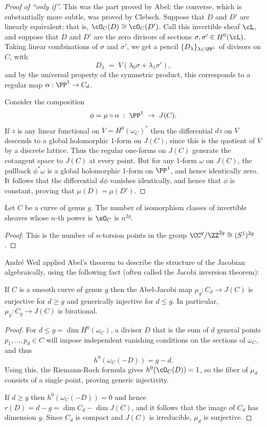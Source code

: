 \begin{proof}[Proof of ``only if'']
This was the part proved by Abel; the converse, which is substantially more subtle, was proved by Clebsch. Suppose that $D$ and $D'$ are linearly equivalent; that is, $\cO_C(D) \cong \cO_C(D')$. Call this invertible sheaf $\cL$, and suppose that $D$ and $D'$ are the zero divisors of sections $\sigma, \sigma' \in H^0(\cL)$.
Taking linear combinations of $\sigma$ and $\sigma'$, we get a pencil $\{D_\lambda\}_{\lambda \in \PP^1}$ of divisors on $C$, with
$$
D_\lambda \; = \; V(\lambda_0\sigma + \lambda_1\sigma'),
$$
and by the universal property of the symmetric product, this corresponds to a regular map $\alpha : \PP^1 \to C_d$. 

Consider the composition
$$
\phi = \mu \circ \alpha \; : \; \PP^1 \; \to \; J(C).
$$
 If $z$ is any linear functional on $V = H^0(\omega_C)^*$ then the differential $dz$  on $V$ descends to a global holomorphic 1-form on
 $J(C)$, since this is the quotient of $V$ by a discrete lattice. Thus the regular one-forms on $J(C)$ generate the cotangent space to $J(C)$ at every point. But for any 1-form $\omega$ on $J(C)$, the pullback $\phi^*\omega$ is a global holomorphic 1-form on $\PP^1$, and hence identically zero. It follows that the differential $d\phi$ vanishes identically, and hence that $\phi$ is constant, proving that $\mu(D) = \mu(D')$.
\end{proof}

\begin{corollary}\label{torsion points}
Let $C$ be a curve of genus $g$. The number of isomorphism classes of invertible sheaves whose $n$-th power is $\sO_C$ is $n^{2g}$.
\end{corollary}
\begin{proof}
 This is the number of $n$-torsion points in the group $\CC^g/\ZZ^{2g} \cong (S^1)^{2g}$.
\end{proof}

Andr\'e Weil applied Abel's theorem to describe the structure of the Jacobian algebraically, using the following fact (often called the Jacobi inversion theorem):

\begin{corollary}
If $C$ is a smooth curve of genus $g$ then the Abel-Jacobi map $\mu_g: C_d \to J(C)$ is  surjective for $d\geq g$ and generically injective for $d\leq g$. In particular, $\mu_g:C_g \to J(C)$ is birational. \end{corollary}

\begin{proof}
For $d\leq g = \dim H^{0}(\omega_{C})$,  a divisor $D$ that is the sum of $d$ general points $p_{1}, \dots,  p_{d} \in C$ will impose independent vanishing conditions on the sections of $\omega_{C}$, and thus
$$
h^0(\omega_C(-D)) = g-d.
$$
 Using this, the Riemann-Roch formula gives $h^{0}(\cO_{C}(D)) = 1$, so the fiber of 
$\mu_{d}$ consists of a single point, proving generic injectivity.

If $d \geq g$ then $h^0(\omega_C(-D)) = 0$ and hence $r(D) = d-g= \dim C_{d} - \dim J(C)$, and it follows that the image of $C_d$ has dimension $g$. Since $C_d$ is compact and $J(C)$ is irreducible, $\mu_{d}$ is surjective.
\end{proof}

